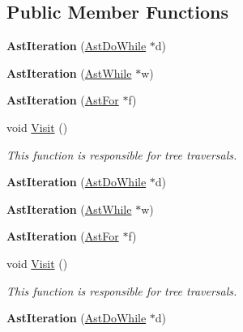 \subsection*{Public Member Functions}
\begin{DoxyCompactItemize}
\item 
\hypertarget{classAstIteration_a9b98ddbdb8795a514c129a86fc00b561}{{\bfseries Ast\-Iteration} (\hyperlink{classAstDoWhile}{Ast\-Do\-While} $\ast$d)}\label{classAstIteration_a9b98ddbdb8795a514c129a86fc00b561}

\item 
\hypertarget{classAstIteration_aed79cf13c2e6376cab0a02b657ef6c87}{{\bfseries Ast\-Iteration} (\hyperlink{classAstWhile}{Ast\-While} $\ast$w)}\label{classAstIteration_aed79cf13c2e6376cab0a02b657ef6c87}

\item 
\hypertarget{classAstIteration_a87f1eaa5c3fc5b4562cbad3e54ff5061}{{\bfseries Ast\-Iteration} (\hyperlink{classAstFor}{Ast\-For} $\ast$f)}\label{classAstIteration_a87f1eaa5c3fc5b4562cbad3e54ff5061}

\item 
void \hyperlink{classAstIteration_ae3e90f781890621279ff29b5481e0d4b}{Visit} ()
\begin{DoxyCompactList}\small\item\em This function is responsible for tree traversals. \end{DoxyCompactList}\item 
\hypertarget{classAstIteration_a9b98ddbdb8795a514c129a86fc00b561}{{\bfseries Ast\-Iteration} (\hyperlink{classAstDoWhile}{Ast\-Do\-While} $\ast$d)}\label{classAstIteration_a9b98ddbdb8795a514c129a86fc00b561}

\item 
\hypertarget{classAstIteration_aed79cf13c2e6376cab0a02b657ef6c87}{{\bfseries Ast\-Iteration} (\hyperlink{classAstWhile}{Ast\-While} $\ast$w)}\label{classAstIteration_aed79cf13c2e6376cab0a02b657ef6c87}

\item 
\hypertarget{classAstIteration_a87f1eaa5c3fc5b4562cbad3e54ff5061}{{\bfseries Ast\-Iteration} (\hyperlink{classAstFor}{Ast\-For} $\ast$f)}\label{classAstIteration_a87f1eaa5c3fc5b4562cbad3e54ff5061}

\item 
void \hyperlink{classAstIteration_ae3e90f781890621279ff29b5481e0d4b}{Visit} ()
\begin{DoxyCompactList}\small\item\em This function is responsible for tree traversals. \end{DoxyCompactList}\item 
\hypertarget{classAstIteration_a9b98ddbdb8795a514c129a86fc00b561}{{\bfseries Ast\-Iteration} (\hyperlink{classAstDoWhile}{Ast\-Do\-While} $\ast$d)}\label{classAstIteration_a9b98ddbdb8795a514c129a86fc00b561}


\end{DoxyCompactItemize}
